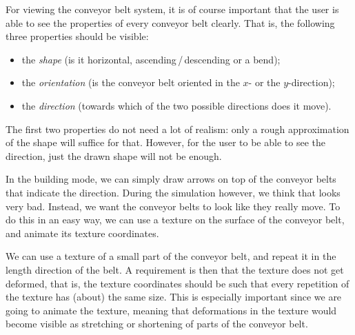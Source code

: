 For viewing the conveyor belt system, it is of course important that the user is able to see the properties of every conveyor belt clearly. That is, the following three properties should be visible:
\begin{itemize}
  \item the \textit{shape} (is it horizontal, ascending\,/\,descending or a bend);
  \item the \textit{orientation} (is the conveyor belt oriented in the $x$- or the $y$-direction);
  \item the \textit{direction} (towards which of the two possible directions does it move).
\end{itemize}
The first two properties do not need a lot of realism: only a rough approximation of the shape will suffice for that. However, for the user to be able to see the direction, just the drawn shape will not be enough.

In the building mode, we can simply draw arrows on top of the conveyor belts that indicate the direction. During the simulation however, we think that looks very bad. Instead, we want the conveyor belts to look like they really move. To do this in an easy way, we can use a texture on the surface of the conveyor belt, and animate its texture coordinates.

We can use a texture of a small part of the conveyor belt, and repeat it in the length direction of the belt. A requirement is then that the texture does not get deformed, that is, the texture coordinates should be such that every repetition of the texture has (about) the same size. This is especially important since we are going to animate the texture, meaning that deformations in the texture would become visible as stretching or shortening of parts of the conveyor belt.

